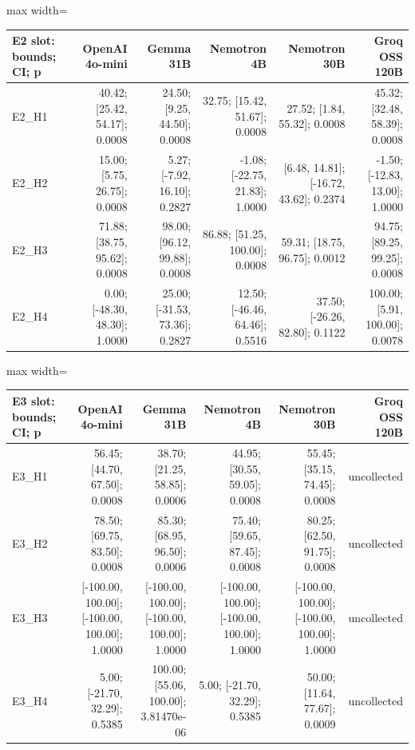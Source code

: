 \documentclass[11pt,a4paper]{article}
\begin{document}
\begin{center}\begingroup\small\setlength{\tabcolsep}{4.5pt}\renewcommand{\arraystretch}{1.12}\begin{adjustbox}{max width=\textwidth}\begin{tabular}{lrrrrr}\toprule
\textbf{E2 slot: bounds; CI; p} & \textbf{OpenAI 4o-mini} & \textbf{Gemma 31B} & \textbf{Nemotron 4B} & \textbf{Nemotron 30B} & \textbf{Groq OSS 120B} \\ \midrule
E2\_\allowbreak{}H1 & 40.42; [25.42, 54.17]; 0.0008 & 24.50; [9.25, 44.50]; 0.0008 & 32.75; [15.42, 51.67]; 0.0008 & 27.52; [1.84, 55.32]; 0.0008 & 45.32; [32.48, 58.39]; 0.0008 \\
E2\_\allowbreak{}H2 & 15.00; [5.75, 26.75]; 0.0008 & 5.27; [-7.92, 16.10]; 0.2827 & -1.08; [-22.75, 21.83]; 1.0000 & [6.48, 14.81]; [-16.72, 43.62]; 0.2374 & -1.50; [-12.83, 13.00]; 1.0000 \\
E2\_\allowbreak{}H3 & 71.88; [38.75, 95.62]; 0.0008 & 98.00; [96.12, 99.88]; 0.0008 & 86.88; [51.25, 100.00]; 0.0008 & 59.31; [18.75, 96.75]; 0.0012 & 94.75; [89.25, 99.25]; 0.0008 \\
E2\_\allowbreak{}H4 & 0.00; [-48.30, 48.30]; 1.0000 & 25.00; [-31.53, 73.36]; 0.2827 & 12.50; [-46.46, 64.46]; 0.5516 & 37.50; [-26.26, 82.80]; 0.1122 & 100.00; [5.91, 100.00]; 0.0078 \\
\bottomrule\end{tabular}\end{adjustbox}\endgroup\end{center}

\begin{center}\begingroup\small\setlength{\tabcolsep}{4.5pt}\renewcommand{\arraystretch}{1.12}\begin{adjustbox}{max width=\textwidth}\begin{tabular}{lrrrrr}\toprule
\textbf{E3 slot: bounds; CI; p} & \textbf{OpenAI 4o-mini} & \textbf{Gemma 31B} & \textbf{Nemotron 4B} & \textbf{Nemotron 30B} & \textbf{Groq OSS 120B} \\ \midrule
E3\_\allowbreak{}H1 & 56.45; [44.70, 67.50]; 0.0008 & 38.70; [21.25, 58.85]; 0.0006 & 44.95; [30.55, 59.05]; 0.0008 & 55.45; [35.15, 74.45]; 0.0008 & uncollected \\
E3\_\allowbreak{}H2 & 78.50; [69.75, 83.50]; 0.0008 & 85.30; [68.95, 96.50]; 0.0006 & 75.40; [59.65, 87.45]; 0.0008 & 80.25; [62.50, 91.75]; 0.0008 & uncollected \\
E3\_\allowbreak{}H3 & [-100.00, 100.00]; [-100.00, 100.00]; 1.0000 & [-100.00, 100.00]; [-100.00, 100.00]; 1.0000 & [-100.00, 100.00]; [-100.00, 100.00]; 1.0000 & [-100.00, 100.00]; [-100.00, 100.00]; 1.0000 & uncollected \\
E3\_\allowbreak{}H4 & 5.00; [-21.70, 32.29]; 0.5385 & 100.00; [55.06, 100.00]; 3.81470e-06 & 5.00; [-21.70, 32.29]; 0.5385 & 50.00; [11.64, 77.67]; 0.0009 & uncollected \\
\bottomrule\end{tabular}\end{adjustbox}\endgroup\end{center}
\end{document}

